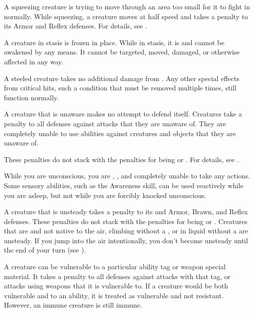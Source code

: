    A squeezing creature is trying to move through an area too small for it to fight in normally.
  While squeezing, a creature moves at half speed and takes a  penalty to its Armor and Reflex defenses.
  For details, see .

   A creature in stasis is frozen in place.
  While in stasis, it is  and cannot be awakened by any means. 
  It cannot be targeted, moved, damaged, or otherwise affected in any way.

   A steeled creature takes no additional damage from .
  Any other special effects from critical hits, such a condition that must be removed multiple times, still function normally.

   A creature that is unaware makes no attempt to defend itself.
  Creatures take a  penalty to all defenses against attacks that they are unaware of.
  They are completely unable to use  abilities against creatures and objects that they are unaware of.

  These penalties do not stack with the penalties for being \partiallyunaware or \unsteady.
  For details, see .

   While you are unconscious, you are \helpless, \unaware, and completely unable to take any actions.
  Some sensory abilities, such as the Awareness skill, can be used reactively while you are asleep, but not while you are forcibly knocked unconscious.

   A creature that is unsteady takes a  penalty to its  and Armor, Brawn, and Reflex defenses.
  These penalties do not stack with the penalties for being \partiallyunaware or \unaware.
  Creatures that are  and not native to the air, climbing without a , or in liquid without a  are unsteady.
  If you jump into the air intentionally, you don't become unsteady until the end of your turn (see ).

  A creature can be vulnerable to a particular ability tag or weapon special material.
  It takes a  penalty to all defenses against attacks with that tag, or attacks using weapons that it is vulnerable to.
  If a creature would be both vulnerable and \resistant to an ability, it is treated as vulnerable and not resistant.
  However, an immune creature is still immune.

